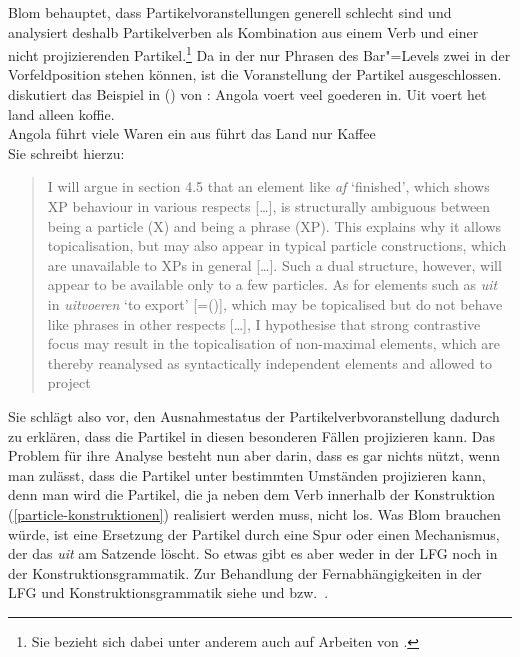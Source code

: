 Blom behauptet, dass Partikelvoranstellungen generell schlecht sind und analysiert
deshalb Partikelverben als Kombination aus einem Verb und einer nicht projizierenden Partikel.\footnote{
 Sie bezieht sich dabei unter anderem auch auf Arbeiten von \citet{Toivonen2002a}.%
}
Da in der \xbart nur Phrasen des Bar"=Levels zwei in der Vorfeldposition stehen können,
ist die Voranstellung der Partikel ausgeschlossen. \citet[]{Blom2005a} diskutiert 
das Beispiel in () von \citet[]{Hoeksema91a}:
\ea
\gll Angola voert veel goederen in. Uit voert het land alleen koffie.\\
     Angola führt viele Waren ein   aus führt das Land nur Kaffee\\
\z
Sie schreibt hierzu:
\begin{quote}
       I will argue in section 4.5 that an element like \emph{af} `finished', which shows XP
behaviour in various respects [\ldots], is structurally ambiguous between being a
particle (X) and being a phrase (XP). This explains why it allows topicalisation, but
may also appear in typical particle constructions, which are unavailable to XPs in
general [\ldots]. Such a dual structure, however, will appear to be available only
to a few particles. As for elements such as \emph{uit} in \emph{uitvoeren} `to export' [=()],
which may be topicalised but do not behave like phrases in other respects [\ldots], I hypothesise that strong contrastive focus may result in the topicalisation of
non-maximal elements, which are thereby reanalysed as syntactically independent
elements and allowed to project 
\citep[]{Blom2005a}
\end{quote}
Sie schlägt also vor, den Ausnahmestatus der Partikelverbvoranstellung dadurch zu erklären,
dass die Partikel in diesen besonderen Fällen projizieren kann. Das Problem für ihre
Analyse besteht nun aber darin, dass es gar nichts nützt, wenn man zulässt, dass die Partikel
unter bestimmten Umständen projizieren kann, denn man wird die Partikel, die ja neben dem
Verb innerhalb der Konstruktion (\ref{particle-konstruktionen}) realisiert werden muss, nicht los.
\z
Was Blom brauchen würde, ist eine Ersetzung der Partikel durch eine Spur oder einen
Mechanismus, der das \emph{uit} am Satzende löscht. So etwas gibt es aber weder in der LFG 
noch in der Konstruktionsgrammatik. Zur Behandlung
der Fernabhängigkeiten in der LFG und Konstruktionsgrammatik siehe  und  bzw.\
.


